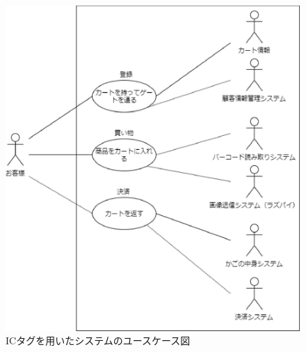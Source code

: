 \begin{figure}[htbp]
\centering
\includegraphics[width = 15cm]{./picture/usecase_ic.eps}
\caption{ICタグを用いたシステムのユースケース図}
\label{usecase_ic}
\end{figure}


